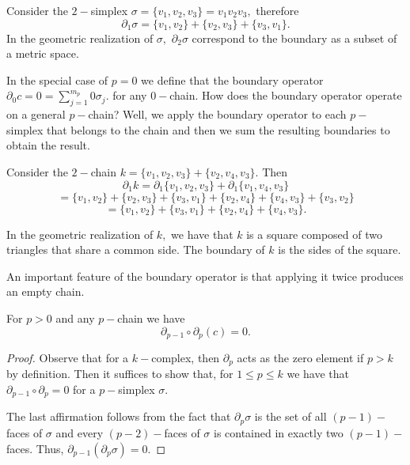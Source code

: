 \documentclass[
	fontsize=10pt, %
	twoside=false, %
	secnumdepth=1, %
]{kaobook}
\begin{document}
\begin{example}
Consider the $2-$simplex $\sigma=\{v_1,v_2,v_3\}=v_1v_2v_3,$ therefore $$\partial_1 \sigma=\{v_1,v_2\}+\{v_2,v_3\}+\{v_3,v_1\}.$$ In the geometric realization of $\sigma,$ $\partial_2\sigma$ correspond to the boundary as a subset of a metric space.

\begin{figure}[h]
\end{figure}
\end{example}

In the special case of $p=0$ we define that the boundary operator $\partial_0 c=0=\sum_{j=1}^{m_p}0\sigma_j.$ for any $0-$chain.
How does the boundary operator operate on a general $p-$chain? Well, we apply the boundary operator to each $p-$simplex that belongs to the chain and then we sum the resulting boundaries to obtain the result.

\begin{example}
Consider the $2-$chain $k=\{v_1,v_2,v_3\}+\{v_2,v_4,v_3\}.$ Then $$\partial_1 k=\partial_1 \{v_1,v_2,v_3\} +\partial_1 \{v_1,v_4,v_3\}$$
$$=\{v_1,v_2\}+\{v_2,v_3\}+\{v_3,v_1\}+\{v_2,v_4\}+\{v_4,v_3\}+\{v_3,v_2\}$$
$$=\{v_1,v_2\}+\{v_3,v_1\}+\{v_2,v_4\}+\{v_4,v_3\}.$$

In the geometric realization of $k,$ we have that $k$ is a square composed of two triangles that share a common side. The boundary of $k$ is the sides of the square.
\end{example}


An important feature of the boundary operator is that applying it twice produces an empty chain.

\begin{proposition}
For $p>0$ and any $p-$chain we have $$\partial_{p-1}\circ\partial_p (c)=0.$$
\end{proposition}
\begin{proof}
Observe that for a $k-$complex, then $\partial_p$ acts as the zero element if $p>k$ by definition. Then it suffices to show that, for $1\leq p\leq k$ we have that $\partial_{p-1}\circ\partial_p=0$ for a $p-$simplex $\sigma.$

The last affirmation follows from the fact that $\partial_p\sigma$  is the set of all $(p-1)-$faces of $\sigma$ and every $(p-2)-$faces of $\sigma$ is contained in exactly two $(p-1)-$faces. Thus, $\partial_{p-1}(\partial_p \sigma)=0.$
\end{proof}
\end{document}

